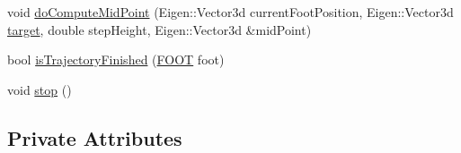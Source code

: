 \begin{DoxyCompactItemize}
\item 
void \hyperlink{classStepController_a16b1f62737f1287b7f33b216871d1ba8}{do\-Compute\-Mid\-Point} (\-Eigen\-::\-Vector3d current\-Foot\-Position, \-Eigen\-::\-Vector3d \hyperlink{classStepController_a588d5b149eb4a6877e89ecff37d0f91d}{target}, double step\-Height, \-Eigen\-::\-Vector3d \&mid\-Point)
\item 
bool \hyperlink{classStepController_a9e2415755548f47301277feb7a376270}{is\-Trajectory\-Finished} (\hyperlink{utils_8h_a4b6a8e135f90bd56e5a57a60efb42529}{\-F\-O\-O\-T} foot)
\item 
void \hyperlink{classStepController_a48224628b92c088a34d9db4a14f75f1a}{stop} ()
\end{DoxyCompactItemize}
\subsection*{\-Private \-Attributes}
